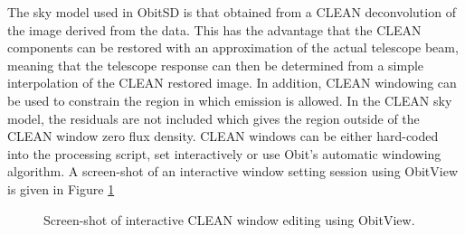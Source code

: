 \documentclass[11pt]{report}
\begin{document}
The sky model used in ObitSD is that obtained from a CLEAN deconvolution
of the image derived from the data.
This has the advantage that the CLEAN components can be restored with
an approximation of the actual telescope beam, meaning that the
telescope response can then be determined from a simple interpolation
of the CLEAN restored image.
In addition, CLEAN windowing can be used to constrain the region in
which emission is allowed.
In the CLEAN sky model, the residuals are not included which gives the
region outside of the CLEAN window zero flux density.
CLEAN windows can be either hard-coded into the processing script, set
interactively or use Obit's automatic windowing algorithm.
A screen-shot of an interactive window setting session using ObitView
is given in Figure \ref{CLEANWindow}
\begin{figure}
\centerline{}
\caption{ 
Screen-shot of interactive CLEAN window editing using ObitView.
}
\label{CLEANWindow}
\end{figure}
\end{document}
